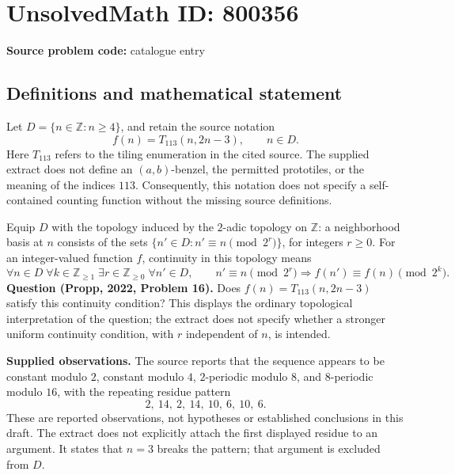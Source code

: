 \documentclass[11pt]{article}
\newcommand{\Z}{\mathbb{Z}}
\begin{document}
\section*{UnsolvedMath ID: 800356}
\textbf{Source problem code:} catalogue entry
\subsection{Definitions and mathematical statement}
Let \(D=\{n\in\Z:n\geq4\}\), and retain the source notation
\[
 f(n)=T_{113}(n,2n-3),\qquad n\in D.
\]
Here \(T_{113}\) refers to the tiling enumeration in the cited source. The supplied extract does not define an \((a,b)\)-benzel, the permitted prototiles, or the meaning of the indices \(113\). Consequently, this notation does not specify a self-contained counting function without the missing source definitions.

Equip \(D\) with the topology induced by the \(2\)-adic topology on \(\Z\): a neighborhood basis at \(n\) consists of the sets \(\{n'\in D:n'\equiv n\pmod{2^r}\}\), for integers \(r\geq0\). For an integer-valued function \(f\), continuity in this topology means
\[
 \forall n\in D\;\forall k\in\Z_{\geq1}\;\exists r\in\Z_{\geq0}\;\forall n'\in D,
 \qquad n'\equiv n\pmod{2^r}
 \Longrightarrow f(n')\equiv f(n)\pmod{2^k}.
\]
\textbf{Question (Propp, 2022, Problem 16).} Does \(f(n)=T_{113}(n,2n-3)\) satisfy this continuity condition? This displays the ordinary topological interpretation of the question; the extract does not specify whether a stronger uniform continuity condition, with \(r\) independent of \(n\), is intended.

\textbf{Supplied observations.} The source reports that the sequence appears to be constant modulo \(2\), constant modulo \(4\), \(2\)-periodic modulo \(8\), and \(8\)-periodic modulo \(16\), with the repeating residue pattern
\[
 2,\ 14,\ 2,\ 14,\ 10,\ 6,\ 10,\ 6.
\]
These are reported observations, not hypotheses or established conclusions in this draft. The extract does not explicitly attach the first displayed residue to an argument. It states that \(n=3\) breaks the pattern; that argument is excluded from \(D\).
\end{document}
